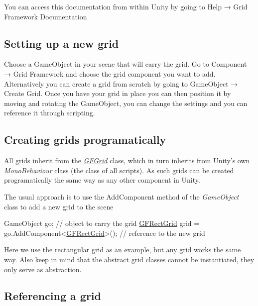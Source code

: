 You can access this documentation from within Unity by going to Help → Grid Framework Documentation

\subsection*{Setting up a new grid }

Choose a Game\+Object in your scene that will carry the grid. Go to Component → Grid Framework and choose the grid component you want to add. Alternatively you can create a grid from scratch by going to Game\+Object → Create Grid. Once you have your grid in place you can then position it by moving and rotating the Game\+Object, you can change the settings and you can reference it through scripting.

\subsection*{Creating grids programatically }

All grids inherit from the {\itshape \hyperlink{class_g_f_grid}{G\+F\+Grid}} class, which in turn inherits from Unity's own {\itshape Mono\+Behaviour} class (the class of all scripts). As such grids can be created programatically the same way as any other component in Unity.

The usual approach is to use the {\ttfamily Add\+Component} method of the {\itshape Game\+Object} class to add a new grid to the scene 
\begin{DoxyCode}
GameObject go;                                   \textcolor{comment}{// object to carry the grid}
\hyperlink{class_g_f_rect_grid}{GFRectGrid} grid = go.AddComponent<\hyperlink{class_g_f_rect_grid}{GFRectGrid}>(); \textcolor{comment}{// reference to the new grid}
\end{DoxyCode}
 Here we use the rectangular grid as an example, but any grid works the same way. Also keep in mind that the abstract grid classes cannot be instantiated, they only serve as abstraction.

\subsection*{Referencing a grid }

